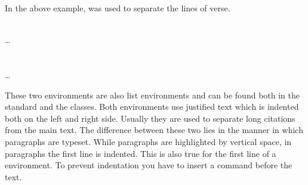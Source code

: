 \begin{Example}
  In the above example,  was used to separate the lines
  of verse.
\end{Example}
\fi %
%
%

\begin{Declaration}
  \\
  \quad\dots\\
  \\
  \\
  \quad\dots\\
\end{Declaration}%
%
%
These two environments are also list environments and can be found
both in the standard and the {\KOMAScript} classes. Both environments
use justified text which is indented both on the left and right side.
Usually they are used to separate long citations from
the main text. The difference between these two lies in the manner in
which paragraphs are typeset. While  paragraphs are
highlighted by vertical space, in  paragraphs
the first line is indented. This is also true for the first line of a
 environment. To prevent indentation you have
to insert a  command before the
text.
\ifCommonmaincls
